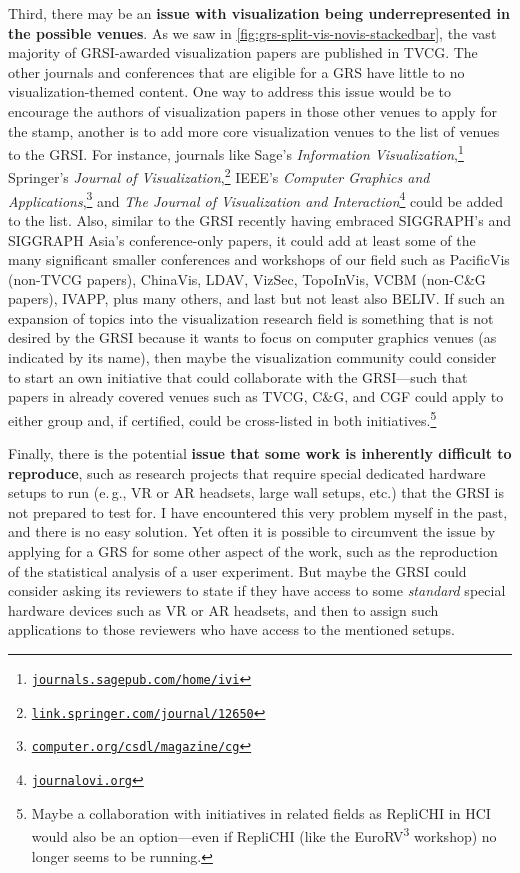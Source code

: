 \documentclass[conference]{vgtc}                     %
\newcommand{\eg}{e.\,g.}
\begin{document}
Third, there may be an \textbf{issue with visualization being underrepresented in the possible venues}. As we saw in \autoref{fig:grs-split-vis-novis-stackedbar}, the vast majority of GRSI-awarded visualization papers are published in TVCG. The other journals and conferences that are eligible for a GRS have little to no visualization-themed content. One way to address this issue would be to encourage the authors of visualization papers in those other venues to apply for the stamp, another is to add more core visualization venues to the list of venues to the GRSI. For instance, journals like Sage's \emph{Information Visualization},\footnote{\href{https://journals.sagepub.com/home/ivi}{\texttt{journals.sagepub.com/home/ivi}}} Springer's \emph{Journal of Visualization},\footnote{\href{https://link.springer.com/journal/12650}{\texttt{link.springer.com/journal/12650}}} IEEE's \emph{Computer Graphics and Applications},\footnote{\href{https://www.computer.org/csdl/magazine/cg}{\texttt{computer.org/csdl/magazine/cg}}} and \emph{The Journal of Visualization and Interaction}\footnote{\href{https://www.journalovi.org/}{\texttt{journalovi.org}}} could be added to the list. Also, similar to the GRSI recently having embraced SIGGRAPH's and SIGGRAPH Asia's conference-only papers, it could add at least some of the many significant smaller conferences and workshops of our field such as PacificVis (non-TVCG papers), ChinaVis, LDAV, VizSec, TopoInVis, VCBM (non-C\&G papers), IVAPP, plus many others, and last but not least also BELIV. If such an expansion of topics into the visualization research field is something that is not desired by the GRSI because it wants to focus on computer graphics venues (as indicated by its name), then maybe the visualization community could consider to start an own initiative that could collaborate with the GRSI---such that papers in already covered venues such as TVCG, C\&G, and CGF could apply to either group and, if certified, could be cross-listed in both initiatives.\footnote{Maybe a collaboration with initiatives in related fields as RepliCHI in HCI \cite{Wilson:2012:RCF,Wilson:2013:RW,Wilson:2014:RW2} would also be an option---even if RepliCHI (like the EuroRV\textsuperscript{3} workshop) no longer seems to be running.}

Finally, there is the potential \textbf{issue that some work is inherently difficult to reproduce}, such as research projects that require special dedicated hardware setups to run (\eg, VR or AR headsets, large wall setups, etc.) that the GRSI is not prepared to test for. I have encountered this very problem myself in the past, and there is no easy solution. Yet often it is possible to circumvent the issue by applying for a GRS for some other aspect of the work, such as the reproduction of the statistical analysis of a user experiment. But maybe the GRSI could consider asking its reviewers to state if they have access to some \emph{standard} special hardware devices such as VR or AR headsets, and then to assign such applications to those reviewers who have access to the mentioned setups.
\end{document}
